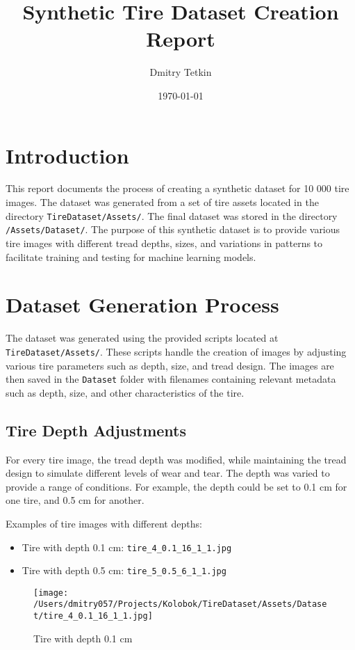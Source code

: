 \documentclass{article}
\title{Synthetic Tire Dataset Creation Report}
\author{Dmitry Tetkin}
\date{\today}
\begin{document}
\maketitle

\section{Introduction}
This report documents the process of creating a synthetic dataset for 10 000 tire images. The dataset was generated from a set of tire assets located in the directory \texttt{TireDataset/Assets/}. The final dataset was stored in the directory \texttt{/Assets/Dataset/}. The purpose of this synthetic dataset is to provide various tire images with different tread depths, sizes, and variations in patterns to facilitate training and testing for machine learning models.

\section{Dataset Generation Process}
The dataset was generated using the provided scripts located at \texttt{TireDataset/Assets/}. These scripts handle the creation of images by adjusting various tire parameters such as depth, size, and tread design. The images are then saved in the \texttt{Dataset} folder with filenames containing relevant metadata such as depth, size, and other characteristics of the tire.

\subsection{Tire Depth Adjustments}
For every tire image, the tread depth was modified, while maintaining the tread design to simulate different levels of wear and tear. The depth was varied to provide a range of conditions. For example, the depth could be set to 0.1 cm for one tire, and 0.5 cm for another. 

Examples of tire images with different depths:
\begin{itemize}
    \item Tire with depth 0.1 cm: \texttt{tire\_4\_0.1\_16\_1\_1.jpg} 
    \item Tire with depth 0.5 cm: \texttt{tire\_5\_0.5\_6\_1\_1.jpg} 
\end{itemize}

\begin{figure}[h!]
\centering
\texttt{[image: /Users/dmitry057/Projects/Kolobok/TireDataset/Assets/Dataset/tire\_4\_0.1\_16\_1\_1.jpg]}
\caption{Tire with depth 0.1 cm}
\end{figure}
\end{document}
